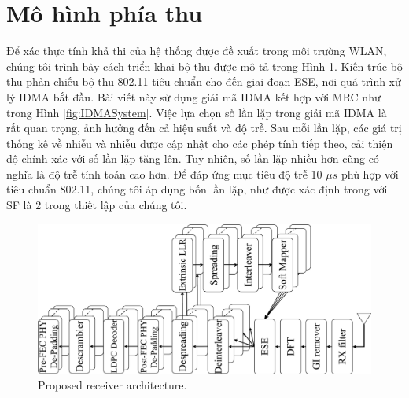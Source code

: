 \section{Mô hình phía thu}

Để xác thực tính khả thi của hệ thống được đề xuất trong môi trường WLAN, chúng tôi trình bày cách triển khai bộ thu được mô tả trong Hình \ref{fig:OFDMA-IDMARx}. Kiến trúc bộ thu phản chiếu bộ thu 802.11 tiêu chuẩn cho đến giai đoạn ESE, nơi quá trình xử lý IDMA bắt đầu. Bài viết này sử dụng giải mã IDMA kết hợp với MRC như trong Hình \ref{fig:IDMASystem}. Việc lựa chọn số lần lặp trong giải mã IDMA là rất quan trọng, ảnh hưởng đến cả hiệu suất và độ trễ. Sau mỗi lần lặp, các giá trị thống kê về nhiễu và nhiễu được cập nhật cho các phép tính tiếp theo, cải thiện độ chính xác với số lần lặp tăng lên. Tuy nhiên, số lần lặp nhiều hơn cũng có nghĩa là độ trễ tính toán cao hơn. Để đáp ứng mục tiêu độ trễ 10 $\mu s$ phù hợp với tiêu chuẩn 802.11, chúng tôi áp dụng bốn lần lặp, như được xác định trong \cite{UL-OFDM-IDMA} với SF là 2 trong thiết lập của chúng tôi.

\begin{figure}[H]
	\centering
	\includegraphics[width=0.75\linewidth]{figure/chap3/Proposed_Receiver.pdf}
	\caption{Proposed receiver architecture.}
	\label{fig:OFDMA-IDMARx}
\end{figure}